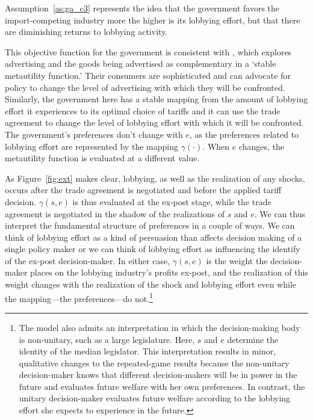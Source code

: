 \documentclass[12pt]{article}
\newcommand{\ga}{\gamma}
\begin{document}
Assumption~\ref{as:ga_c3} represents the idea that the government favors the import-competing industry more the higher is its lobbying effort, but that there are diminishing returns to lobbying activity. 

This objective function for the government is consistent with \Textcite{bm93}, which explores advertising and the goods being advertised as complementary in a `stable metautility function.' Their consumers are sophisticated and can advocate for policy to change the level of advertising with which they will be confronted. Similarly, the government here has a stable mapping from the amount of lobbying effort it experiences to its optimal choice of tariffs and it can use the trade agreement to change the level of lobbying effort with which it will be confronted. The government's preferences don't change with $e$, as the preferences related to lobbying effort are represented by the mapping $\ga(\cdot)$. When $e$ changes, the metautility function is evaluated at a different value.

As Figure~\ref{fig:ext} makes clear, lobbying, as well as the realization of any shocks, occurs after the trade agreement is negotiated and before the applied tariff decision. $\ga(s,e)$ is thus evaluated at the ex-post stage, while the trade agreement is negotiated in the shadow of the realizations of $s$ and $e$. We can thus interpret the fundamental structure of preferences in a couple of ways. We can think of lobbying effort as a kind of persuasion than affects decision making of a single policy maker or we can think of lobbying effort as influencing the identify of the ex-post decision-maker. In either case, $\ga(s,e)$ is the weight the decision-maker places on the lobbying industry's profits ex-post, and the realization of this weight changes with the realization of the shock and lobbying effort even while the mapping---the preferences---do not.\footnote{The model also admits an interpretation in which the decision-making body is non-unitary, such as a large legislature. Here, $s$ and $e$ determine the identity of the median legislator. This interpretation results in minor, qualitative changes to the repeated-game results because the non-unitary decision-maker knows that different decision-makers will be in power in the future and evaluates future welfare with her own preferences. In contrast, the unitary decision-maker evaluates future welfare according to the lobbying effort she expects to experience in the future.} 
\end{document}
